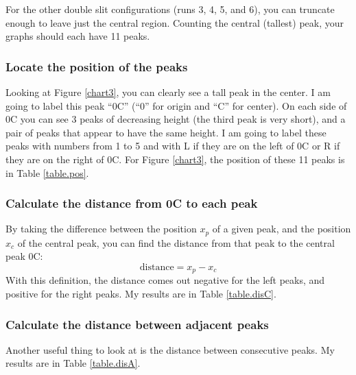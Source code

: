 For the other double slit configurations (runs 3, 4, 5, and 6), you can truncate enough to leave just the central region. Counting the central (tallest) peak, your graphs should each have 11 peaks.
\subsubsection{Locate the position of the peaks}
Looking at Figure \ref{chart3}, you can clearly see a tall peak in the center. I am going to label this peak ``0C'' (``0'' for origin and ``C'' for center). On each side of 0C you can see 3 peaks of decreasing height (the third peak is very short), and a pair of peaks that appear to have the same height. I am going to label these peaks with numbers from 1 to 5 and with L if they are on the left of 0C or R if they are on the right of 0C. For Figure \ref{chart3}, the position of these 11 peaks is in Table \ref{table.pos}.
\subsubsection{Calculate the distance from 0C to each peak}
By taking the difference between the position $x_{p}$ of a given peak, and the position $x_{c}$ of the central peak, you can find the distance from that peak to the central peak 0C:
\begin{equation}
	\text{distance} = x_{p} - x_{c}
\end{equation}
With this definition, the distance comes out negative for the left peaks, and positive for the right peaks. My results are in Table \ref{table.disC}.
\subsubsection{Calculate the distance between adjacent peaks}
Another useful thing to look at is the distance between consecutive peaks. My results are in Table \ref{table.disA}.

